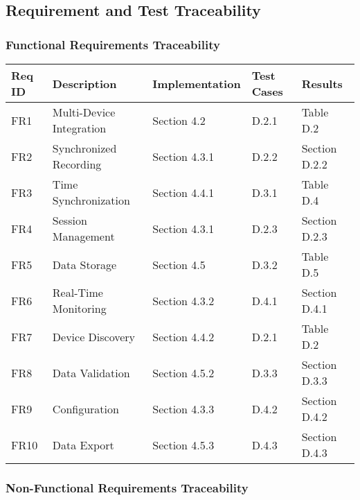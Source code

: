 \subsection{Requirement and Test Traceability}

\subsubsection{Functional Requirements Traceability}

\begin{longtable}{|l|l|l|l|l|}
\hline
\textbf{Req ID} & \textbf{Description} & \textbf{Implementation} & \textbf{Test Cases} & \textbf{Results} \\
\hline
\endhead
FR1 & Multi-Device Integration & Section 4.2 & D.2.1 & Table D.2 \\
FR2 & Synchronized Recording & Section 4.3.1 & D.2.2 & Section D.2.2 \\
FR3 & Time Synchronization & Section 4.4.1 & D.3.1 & Table D.4 \\
FR4 & Session Management & Section 4.3.1 & D.2.3 & Section D.2.3 \\
FR5 & Data Storage & Section 4.5 & D.3.2 & Table D.5 \\
FR6 & Real-Time Monitoring & Section 4.3.2 & D.4.1 & Section D.4.1 \\
FR7 & Device Discovery & Section 4.4.2 & D.2.1 & Table D.2 \\
FR8 & Data Validation & Section 4.5.2 & D.3.3 & Section D.3.3 \\
FR9 & Configuration & Section 4.3.3 & D.4.2 & Section D.4.2 \\
FR10 & Data Export & Section 4.5.3 & D.4.3 & Section D.4.3 \\
\hline
\end{longtable}

\subsubsection{Non-Functional Requirements Traceability}

